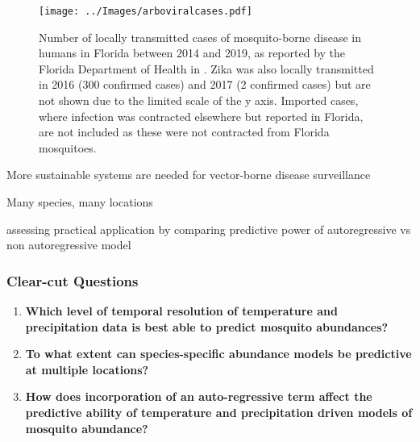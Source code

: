 \begin{figure}[h]
	\centering
	\texttt{[image: ../Images/arboviralcases.pdf]}
	\caption{Number of locally transmitted cases of mosquito-borne disease in humans in Florida between 2014 and 2019, as reported by the Florida Department of Health in  \citeyear{DiseaseSurveillance}. Zika was also locally transmitted in 2016 (300 confirmed cases) and 2017 (2 confirmed cases) but are not shown due to the limited scale of the y axis. Imported cases, where infection was contracted elsewhere but reported in Florida, are not included as these were not contracted from Florida mosquitoes. %
	}
	\label{fig:FDcases}
\end{figure}

More sustainable systems are needed for vector-borne disease surveillance \citep{Vazquez-Prokopec2010}

Many species, many locations

assessing practical application by comparing predictive power of autoregressive vs non autoregressive model

\subsubsection{Clear-cut Questions}
\begin{enumerate}
	

	\item \textbf{Which level of temporal resolution of temperature and precipitation data is best able to predict mosquito abundances?}
	
	\item \textbf{To what extent can species-specific abundance models be predictive at multiple locations?}
	
	\item \textbf{How does incorporation of an auto-regressive term affect the predictive ability of temperature and precipitation driven models of mosquito abundance?}
\end{enumerate}

